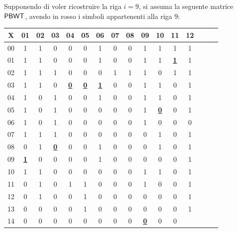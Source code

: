 \begin{esempio}
   Supponendo di voler ricostruire la riga $i=9$, si assuma la seguente matrice
   $\mbox{\rm {\sf PBWT}}$, avendo in rosso i simboli appartenenti alla riga 9: 
   \begin{table}[H]
     \centering
     \scriptsize
     \begin{tabular}{c|ccccccccccccccc}
       X & 01 & 02 & 03 & 04 & 05 & 06 & 07 & 08 & 09 & 10 & 11 & 12 \\
       \hline
       00 & 1 & 1 & 0 & 0 & 0 & 1 & 0 & 0 & 1 & 1 & 1 & 1 \\
       01 & 1 & 1 & 0 & 0 & 0 & 1 & 0 & 0 & 1 & 1 & {\color{nordred}\textbf{\underline{1}}}
                                                                & 1 \\
       02 & 1 & 1 & 1 & 0 & 0 & 0 & 1 & 1 & 1 & 0 & 1 & 1 \\
       03 & 1 & 1 & 0 & {\color{nordred}\textbf{\underline{0}}} & {\color{nordred}\textbf{\underline{0}}}
                                  & {\color{nordred}\textbf{\underline{1}}} & 0 & 0 & 1 & 1
                                                           & 0 & 1 \\
       04 & 1 & 0 & 1 & 0 & 0 & 1 & 0 & 0 & 1 & 1 & 0 & 1 \\
       05 & 1 & 0 & 1 & 0 & 0 & 0 & 0 & 0 & 1 & {\color{nordred}\textbf{\underline{0}}} & 0
                                                                & 1 \\
       06 & 1 & 0 & 1 & 0 & 0 & 0 & 0 & 0 & 1 & 0 & 0 & 0 \\
       07 & 1 & 1 & 1 & 0 & 0 & 0 & 0 & 0 & 0 & 1 & 0 & 1 \\
       08 & 0 & 1 & {\color{nordred}\textbf{\underline{0}}} & 0 & 0 & 1 & 0 & 0 & 0 & 1 & 0
                                                                & 1 \\
       09 & {\color{nordred}\textbf{\underline{1}}} & 0 & 0 & 0 & 0 & 1 & 0 & 0 & 0 & 0 & 0
                                                                & 1 \\
       10 & 1 & 1 & 0 & 0 & 0 & 0 & 0 & 0 & 1 & 1 & 0 & 1 \\
       11 & 0 & 1 & 0 & 1 & 1 & 0 & 0 & 0 & 1 & 0 & 0 & 1 \\
       12 & 0 & 1 & 0 & 0 & 1 & 0 & 0 & 0 & 0 & 0 & 0 & 1 \\
       13 & 0 & 0 & 0 & 0 & 1 & 0 & 0 & 0 & 0 & 0 & 0 & 1 \\
       14 & 0 & 0 & 0 & 0 & 0 & 0 & 0 & 0 & {\color{nordred}\textbf{\underline{0}}} & 0 & 0

\end{tabular}
\end{table}
\end{esempio}
